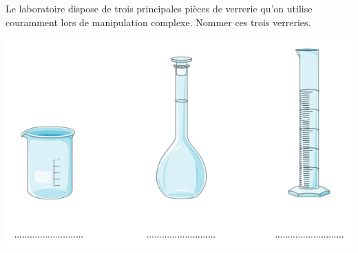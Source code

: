 \begin{tcolorbox}[colback=orange!5!white,colframe=orange!75!black,title= Scénario:]
Le laboratoire dispose de trois principales pièces de verrerie qu'on utilise couramment lors de manipulation complexe. Nommer ces trois verreries.
\begin{center}
    \includegraphics[scale=0.7]{Images/TP4/Verrerie_a_completer.png}
\end{center}
\end{tcolorbox}

